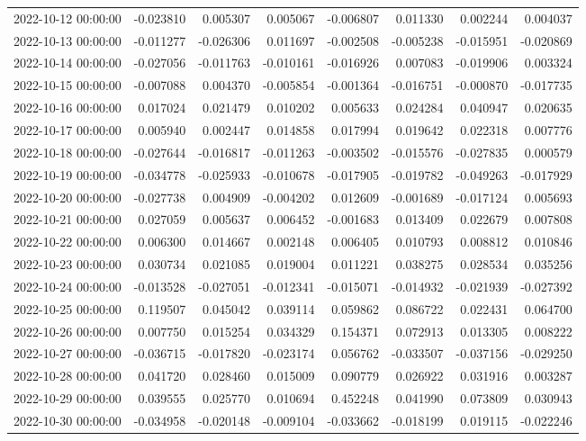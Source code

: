 \begin{tabular}{lrrrrrrr}
2022-10-12 00:00:00 & -0.023810 & 0.005307 & 0.005067 & -0.006807 & 0.011330 & 0.002244 & 0.004037 \\
2022-10-13 00:00:00 & -0.011277 & -0.026306 & 0.011697 & -0.002508 & -0.005238 & -0.015951 & -0.020869 \\
2022-10-14 00:00:00 & -0.027056 & -0.011763 & -0.010161 & -0.016926 & 0.007083 & -0.019906 & 0.003324 \\
2022-10-15 00:00:00 & -0.007088 & 0.004370 & -0.005854 & -0.001364 & -0.016751 & -0.000870 & -0.017735 \\
2022-10-16 00:00:00 & 0.017024 & 0.021479 & 0.010202 & 0.005633 & 0.024284 & 0.040947 & 0.020635 \\
2022-10-17 00:00:00 & 0.005940 & 0.002447 & 0.014858 & 0.017994 & 0.019642 & 0.022318 & 0.007776 \\
2022-10-18 00:00:00 & -0.027644 & -0.016817 & -0.011263 & -0.003502 & -0.015576 & -0.027835 & 0.000579 \\
2022-10-19 00:00:00 & -0.034778 & -0.025933 & -0.010678 & -0.017905 & -0.019782 & -0.049263 & -0.017929 \\
2022-10-20 00:00:00 & -0.027738 & 0.004909 & -0.004202 & 0.012609 & -0.001689 & -0.017124 & 0.005693 \\
2022-10-21 00:00:00 & 0.027059 & 0.005637 & 0.006452 & -0.001683 & 0.013409 & 0.022679 & 0.007808 \\
2022-10-22 00:00:00 & 0.006300 & 0.014667 & 0.002148 & 0.006405 & 0.010793 & 0.008812 & 0.010846 \\
2022-10-23 00:00:00 & 0.030734 & 0.021085 & 0.019004 & 0.011221 & 0.038275 & 0.028534 & 0.035256 \\
2022-10-24 00:00:00 & -0.013528 & -0.027051 & -0.012341 & -0.015071 & -0.014932 & -0.021939 & -0.027392 \\
2022-10-25 00:00:00 & 0.119507 & 0.045042 & 0.039114 & 0.059862 & 0.086722 & 0.022431 & 0.064700 \\
2022-10-26 00:00:00 & 0.007750 & 0.015254 & 0.034329 & 0.154371 & 0.072913 & 0.013305 & 0.008222 \\
2022-10-27 00:00:00 & -0.036715 & -0.017820 & -0.023174 & 0.056762 & -0.033507 & -0.037156 & -0.029250 \\
2022-10-28 00:00:00 & 0.041720 & 0.028460 & 0.015009 & 0.090779 & 0.026922 & 0.031916 & 0.003287 \\
2022-10-29 00:00:00 & 0.039555 & 0.025770 & 0.010694 & 0.452248 & 0.041990 & 0.073809 & 0.030943 \\
2022-10-30 00:00:00 & -0.034958 & -0.020148 & -0.009104 & -0.033662 & -0.018199 & 0.019115 & -0.022246 \\

\end{tabular}

